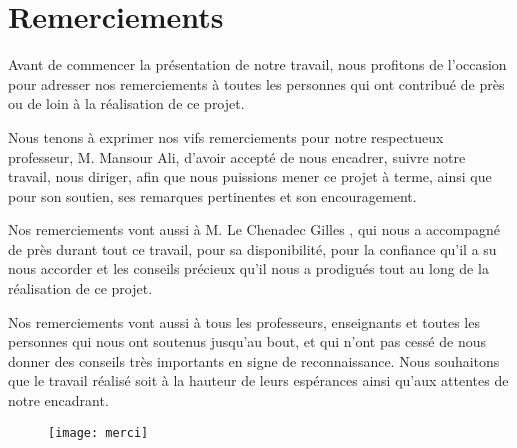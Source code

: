 
\chapter*{Remerciements}

Avant de commencer la présentation de notre travail, nous profitons de l’occasion pour adresser nos remerciements à toutes les personnes qui ont contribué de près ou de loin à la réalisation de ce projet.

Nous tenons à exprimer nos vifs remerciements pour notre respectueux professeur, M. Mansour Ali, d’avoir accepté de nous encadrer, suivre notre travail, nous diriger, afin que nous puissions mener ce projet à terme, ainsi que pour son soutien, ses remarques pertinentes et son encouragement.

Nos remerciements vont aussi à M. Le Chenadec Gilles , qui nous a accompagné de près durant tout ce travail, pour sa disponibilité, pour la confiance qu’il a su nous accorder et les conseils précieux qu’il nous a prodigués tout au long de la réalisation de ce projet.

Nos remerciements vont aussi à tous les professeurs, enseignants et toutes les personnes qui nous ont soutenus jusqu’au bout, et qui n’ont pas cessé de nous donner des conseils très importants en signe de reconnaissance. Nous souhaitons que le travail réalisé soit à la hauteur de leurs espérances ainsi qu’aux attentes de notre encadrant.


\begin{figure}[!h]
  \centering
  \texttt{[image: merci]}
\end{figure}

